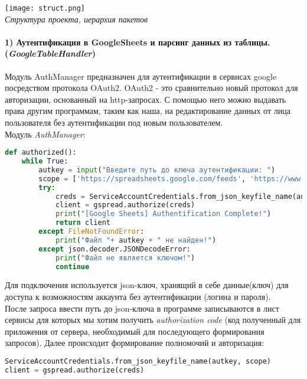     \begin{center}
        \texttt{[image: struct.png]}\\
        \textit{Структура проекта, иерархия пакетов}
    \end{center}
    
    \paragraph{1) Аутентификация в GoogleSheets и парсинг данных из таблицы.(\textit{GoogleTableHandler})\\
    }
    
    Модуль AuthManager предназначен для аутентификации в сервисах google посредством протокола OAuth2. OAuth2 - это сравнительно новый протокол для авторизации, основанный на http-запросах. С помощью него можно выдавать права другим программам, таким как наша, на редактирование данных от лица пользователя без аутентификации под новым пользователем.\\
    
    Модуль \textit{AuthManager}:
    \begin{lstlisting}[language=Python]
def authorized():
    while True:
        autkey = input("Введите путь до ключа аутентификации: ")
        scope = ['https://spreadsheets.google.com/feeds', 'https://www.googleapis.com/auth/drive']
        try:
            creds = ServiceAccountCredentials.from_json_keyfile_name(autkey, scope)
            client = gspread.authorize(creds)
            print("[Google Sheets] Authentification Complete!")
            return client
        except FileNotFoundError:
            print("Файл "+ autkey + " не найден!")
        except json.decoder.JSONDecodeError:
            print("Файл не является ключом!")
            continue
    \end{lstlisting}
    
    Для подключения используется json-ключ, хранящий в себе данные(ключ) для доступа к возможностям аккаунта без аутентификации (логина и пароля).\\
    После запроса ввести путь до json-ключа в программе записываются в лист сервисы для которых мы хотим получить \textit{authorization code} (код полученный для приложения от сервера, необходимый для последующего формирования запросов).
    Далее происходит формирование полномочий и авторизация:
    
    \begin{lstlisting}[language=Python]
ServiceAccountCredentials.from_json_keyfile_name(autkey, scope)
client = gspread.authorize(creds)
    \end{lstlisting}
    
